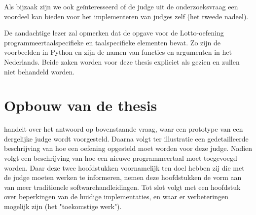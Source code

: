 Als bijzaak zijn we ook geïnteresseerd of de judge uit de onderzoeksvraag een voordeel kan bieden voor het implementeren van judges zelf (het tweede nadeel).

De aandachtige lezer zal opmerken dat de opgave voor de Lotto-oefening programmeertaalspecifieke en taalspecifieke elementen bevat.
Zo zijn de voorbeelden in Python en zijn de namen van functies en argumenten in het Nederlands.
Beide zaken worden voor deze thesis expliciet als  gezien en zullen niet behandeld worden.

\section{Opbouw van de thesis}\label{sec:opbouw}

 handelt over het antwoord op bovenstaande vraag, waar een prototype van een dergelijke judge wordt voorgesteld.
Daarna volgt ter illustratie een gedetailleerde beschrijving van hoe een oefening opgesteld moet worden voor deze judge.
Nadien volgt een beschrijving van hoe een nieuwe programmeertaal moet toegevoegd worden.
Daar deze twee hoofdstukken voornamelijk ten doel hebben zij die met de judge moeten werken te informeren, nemen deze hoofdstukken de vorm aan van meer traditionele softwarehandleidingen.
Tot slot volgt met een hoofdstuk over beperkingen van de huidige implementaties, en waar er verbeteringen mogelijk zijn (het "toekomstige werk").
